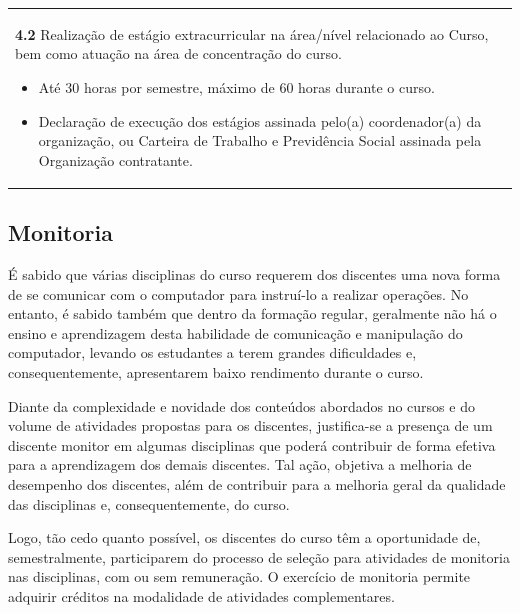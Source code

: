 \documentclass[
	12pt,				%
	openright,			%
	twoside,			%
	a4paper,			%
	chapter=TITLE,		%
	english,			%
	french,				%
	spanish,			%
	brazil,				%
	]{abntex2}
\begin{document}
\begin{quadro}[t]
{\begin{tabularx}{\textwidth}{X X}
 	\textbf{4.2} Realização de estágio extracurricular na área/nível relacionado ao Curso, bem como atuação na área de concentração do curso.
 	\begin{itemize}[itemsep=-0.25em, topsep=0em]
 	  \item[\faClockO] Até 30 horas por semestre, máximo de 60 horas durante o curso.
 	 \item[\faCheckCircle] Declaração de execução dos estágios assinada pelo(a) coordenador(a) da organização, ou Carteira de Trabalho e Previdência Social assinada pela Organização contratante.
 	 \vspace{-1em}
 	\end{itemize}
	
\end{tabularx}
	}{
	
	
	}
\end{quadro}


\subsection{Monitoria}

É sabido que várias disciplinas do curso  requerem dos discentes  uma nova forma de se comunicar com o computador para instruí-lo a realizar operações. No entanto, é sabido também que dentro da formação regular, geralmente não há o ensino e aprendizagem desta  habilidade de comunicação e manipulação do computador,  levando os estudantes a terem grandes dificuldades e, consequentemente, apresentarem baixo rendimento durante o curso.

Diante da complexidade e novidade dos conte\'udos abordados no cursos e do  volume de atividades propostas para os discentes, justifica-se a presen\c{c}a de um discente monitor em algumas disciplinas que poder\'a contribuir de forma efetiva para a aprendizagem dos demais discentes. Tal a\c{c}\~ao, objetiva a melhoria de  desempenho dos discentes, al\'em de contribuir para a melhoria geral da qualidade das disciplinas e, consequentemente, do curso. 

Logo, tão cedo quanto possível,  os discentes do curso têm a oportunidade de, semestralmente, participarem do processo de seleção para atividades de monitoria nas disciplinas, com ou sem remuneração. O exercício de monitoria permite adquirir créditos na modalidade de atividades complementares.
\end{document}
